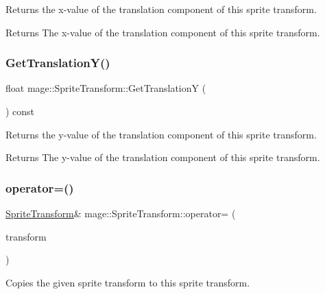 Returns the x-\/value of the translation component of this sprite transform.

\begin{DoxyReturn}{Returns}
The x-\/value of the translation component of this sprite transform. 
\end{DoxyReturn}
\hypertarget{structmage_1_1_sprite_transform_a7cf25b0261f0fd65339a9c3e119e2573}{}\label{structmage_1_1_sprite_transform_a7cf25b0261f0fd65339a9c3e119e2573} 
\subsubsection{\texorpdfstring{Get\+Translation\+Y()}{GetTranslationY()}}
{\footnotesize\ttfamily float mage\+::\+Sprite\+Transform\+::\+Get\+TranslationY (\begin{DoxyParamCaption}{ }\end{DoxyParamCaption}) const}

Returns the y-\/value of the translation component of this sprite transform.

\begin{DoxyReturn}{Returns}
The y-\/value of the translation component of this sprite transform. 
\end{DoxyReturn}
\hypertarget{structmage_1_1_sprite_transform_af0adccff92d48e7b347e66277981ee07}{}\label{structmage_1_1_sprite_transform_af0adccff92d48e7b347e66277981ee07} 
\subsubsection{\texorpdfstring{operator=()}{operator=()}}
{\footnotesize\ttfamily \hyperlink{structmage_1_1_sprite_transform}{Sprite\+Transform}\& mage\+::\+Sprite\+Transform\+::operator= (\begin{DoxyParamCaption}\item[{const \hyperlink{structmage_1_1_sprite_transform}{Sprite\+Transform} \&}]{transform }\end{DoxyParamCaption})\hspace{0.3cm}{\ttfamily [default]}}

Copies the given sprite transform to this sprite transform.


